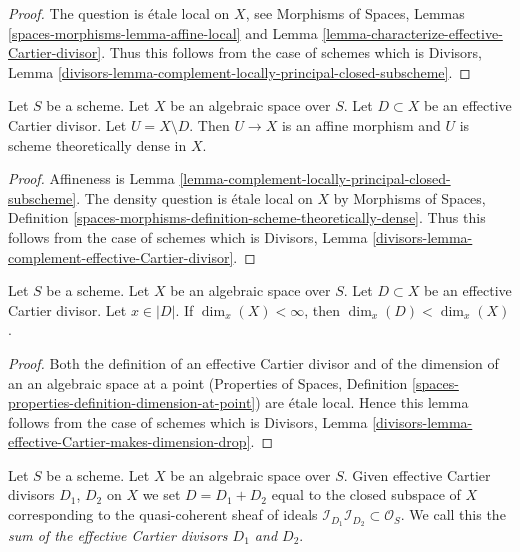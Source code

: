 \begin{proof}
The question is \'etale local on $X$, see
Morphisms of Spaces, Lemmas \ref{spaces-morphisms-lemma-affine-local}
and
Lemma \ref{lemma-characterize-effective-Cartier-divisor}.
Thus this follows from the case of schemes which is
Divisors, Lemma
\ref{divisors-lemma-complement-locally-principal-closed-subscheme}.
\end{proof}

\begin{lemma}
\label{lemma-complement-effective-Cartier-divisor}
Let $S$ be a scheme. Let $X$ be an algebraic space over $S$.
Let $D \subset X$ be an effective Cartier divisor.
Let $U = X \setminus D$. Then $U \to X$ is an affine morphism and $U$
is scheme theoretically dense in $X$.
\end{lemma}

\begin{proof}
Affineness is Lemma \ref{lemma-complement-locally-principal-closed-subscheme}.
The density question is \'etale local on $X$ by
Morphisms of Spaces, Definition
\ref{spaces-morphisms-definition-scheme-theoretically-dense}.
Thus this follows from the case of schemes which is
Divisors, Lemma
\ref{divisors-lemma-complement-effective-Cartier-divisor}.
\end{proof}

\begin{lemma}
\label{lemma-effective-Cartier-makes-dimension-drop}
Let $S$ be a scheme. Let $X$ be an algebraic space over $S$.
Let $D \subset X$ be an effective Cartier divisor.
Let $x \in |D|$.
If $\dim_x(X) < \infty$, then $\dim_x(D) < \dim_x(X)$.
\end{lemma}

\begin{proof}
Both the definition of an effective Cartier divisor and of the
dimension of an an algebraic space at a point
(Properties of Spaces, Definition
\ref{spaces-properties-definition-dimension-at-point})
are \'etale local. Hence this lemma follows from the case of schemes
which is
Divisors, Lemma \ref{divisors-lemma-effective-Cartier-makes-dimension-drop}.
\end{proof}

\begin{definition}
\label{definition-sum-effective-Cartier-divisors}
Let $S$ be a scheme. Let $X$ be an algebraic space over $S$.
Given effective Cartier divisors
$D_1$, $D_2$ on $X$ we set $D = D_1 + D_2$ equal to the
closed subspace of $X$ corresponding to the quasi-coherent
sheaf of ideals
$\mathcal{I}_{D_1}\mathcal{I}_{D_2} \subset \mathcal{O}_S$.
We call this the {\it sum of the effective Cartier divisors
$D_1$ and $D_2$}.
\end{definition}

